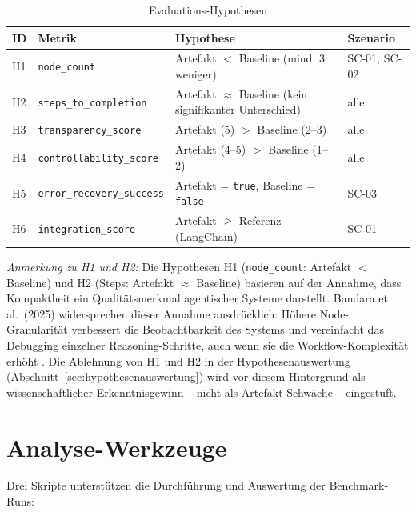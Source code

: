\documentclass[12pt,a4paper,oneside]{report}
\begin{document}
\begin{table}[H]
  \centering
  \caption{Evaluations-Hypothesen}
  \label{tab:hypothesen}
  \begin{tabularx}{\textwidth}{llXl}
    \toprule
    \textbf{ID} & \textbf{Metrik} & \textbf{Hypothese} & \textbf{Szenario} \\
    \midrule
    H1 & \texttt{node\_count}           & Artefakt $<$ Baseline (mind. 3 weniger) & SC-01, SC-02 \\
    H2 & \texttt{steps\_to\_completion} & Artefakt $\approx$ Baseline (kein signifikanter Unterschied) & alle \\
    H3 & \texttt{transparency\_score}   & Artefakt (5) $>$ Baseline (2--3) & alle \\
    H4 & \texttt{controllability\_score}& Artefakt (4--5) $>$ Baseline (1--2) & alle \\
    H5 & \texttt{error\_recovery\_success} & Artefakt = \texttt{true}, Baseline = \texttt{false} & SC-03 \\
    H6 & \texttt{integration\_score}    & Artefakt $\geq$ Referenz (LangChain) & SC-01 \\
    \bottomrule
  \end{tabularx}
\end{table}

\noindent\textit{Anmerkung zu H1 und H2:} Die Hypothesen H1 (\texttt{node\_count}:
Artefakt $<$ Baseline) und H2 (Steps: Artefakt $\approx$ Baseline) basieren auf der
Annahme, dass Kompaktheit ein Qualitätsmerkmal agentischer Systeme darstellt.
Bandara et al.\ (2025) widersprechen dieser Annahme ausdrücklich: Höhere
Node-Granularität verbessert die Beobachtbarkeit des Systems und vereinfacht das
Debugging einzelner Reasoning-Schritte, auch wenn sie die Workflow-Komplexität
erhöht \cite{bandara2025practical}. Die Ablehnung von H1 und H2 in der
Hypothesenauswertung (Abschnitt~\ref{sec:hypothesenauswertung}) wird vor diesem
Hintergrund als wissenschaftlicher Erkenntnisgewinn -- nicht als Artefakt-Schwäche --
eingestuft.

\section{Analyse-Werkzeuge}

Drei Skripte unterstützen die Durchführung und Auswertung der Benchmark-Runs:
\end{document}
